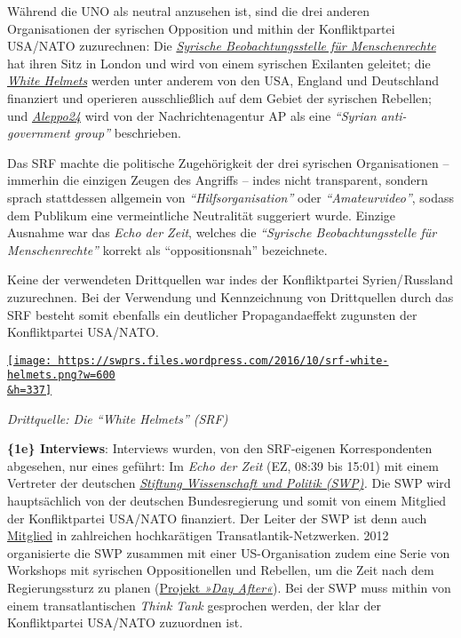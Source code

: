 Während die UNO als neutral anzusehen ist, sind die drei anderen
Organisationen der syrischen Opposition und mithin der Konfliktpartei
USA/NATO zuzurechnen: Die
\emph{\href{https://de.wikipedia.org/wiki/Syrische_Beobachtungsstelle_f\%C3\%BCr_Menschenrechte}{Syrische
Beobach­tungs­stelle für Menschen­rechte}} hat ihren Sitz in London und
wird von einem syrischen Exilanten geleitet; die
\emph{\href{https://en.wikipedia.org/wiki/Syrian_Civil_Defense}{White
Helmets}} werden unter anderem von den USA, England und Deutschland
finanziert und operieren ausschließlich auf dem Gebiet der syrischen
Rebellen; und
\emph{\href{http://hosted2.ap.org/APDEFAULT/3d281c11a96b4ad082fe88aa0db04305/Article_2016-09-20-Syria/id-c7267984287249e3be724a1da5e14af6}{Aleppo24}}
wird von der Nachrichtenagentur AP als eine \emph{``Syrian
anti-government group''} beschrieben.

Das SRF machte die politische Zugehörigkeit der drei syrischen
Organisationen -- immerhin die einzigen Zeugen des Angriffs -- indes
nicht transparent, sondern sprach stattdessen allgemein von
\emph{``Hilfsorganisation''} oder \emph{``Amateurvideo''}, sodass dem
Publikum eine vermeintliche Neutralität suggeriert wurde. Einzige
Ausnahme war das \emph{Echo der Zeit}, welches die \emph{``Syrische
Beobachtungsstelle für Menschenrechte''} korrekt als ``oppositionsnah''
bezeichnete.

Keine der verwendeten Drittquellen war indes der Konfliktpartei
Syrien/ Russland zuzurechnen. Bei der Verwendung und Kennzeichnung von
Drittquellen durch das SRF besteht somit ebenfalls ein deutlicher
Propagandaeffekt zugunsten der Konfliktpartei USA/NATO.

\href{https://swprs.files.wordpress.com/2016/10/srf-white-helmets.png}{\texttt{[image: https://swprs.files.wordpress.com/2016/10/srf-white-helmets.png?w=600\\\&h=337]}}

\emph{Drittquelle: Die ``White Helmets'' (SRF)}

\textbf{\{1e\} Interviews}: Interviews wurden, von den SRF-eigenen
Korrespondenten abgesehen, nur eines geführt: Im \emph{Echo der Zeit}
(EZ, 08:39 bis 15:01) mit einem Vertreter der deutschen
\emph{\href{https://de.wikipedia.org/wiki/Stiftung_Wissenschaft_und_Politik}{Stiftung
Wissenschaft und Politik (SWP)}.} Die SWP wird hauptsächlich von der
deutschen Bundesregierung und somit von einem Mitglied der
Konfliktpartei USA/NATO finanziert. Der Leiter der SWP ist denn auch
\href{https://spiegelkabinett-blog.blogspot.com/2014/05/stiftung-fur-wissenschaft-und-politik.html}{Mitglied}
in zahlreichen hochkarätigen Transatlantik-Netzwerken. 2012 organisierte
die SWP zusammen mit einer US-Organisation zudem eine Serie von
Workshops mit syrischen Oppositionellen und Rebellen, um die Zeit nach
dem Regierungssturz zu planen
(\href{http://www.zeit.de/2012/31/Syrien-Bundesregierung}{Projekt
\emph{»Day After«}}). Bei der SWP muss mithin von einem
transatlantischen \emph{Think Tank} gesprochen werden, der klar der
Konfliktpartei USA/NATO zuzuordnen ist.

